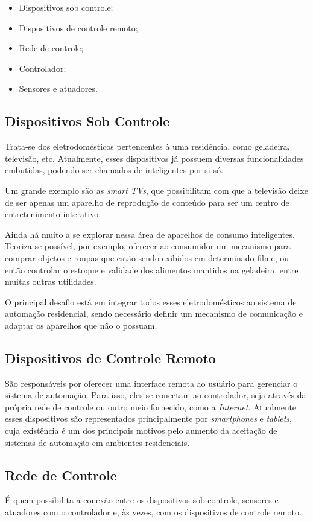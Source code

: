 \begin{itemize}
	\item Dispositivos sob controle;
	\item Dispositivos de controle remoto;
	\item Rede de controle;
	\item Controlador;
	\item Sensores e atuadores.
\end{itemize}

\subsection{Dispositivos Sob Controle}
Trata-se dos eletrodomésticos pertencentes à uma residência, como geladeira, televisão, etc. Atualmente,
esses dispositivos já possuem diversas funcionalidades embutidas, podendo ser chamados de inteligentes por si
só.

Um grande exemplo são as \textit{smart TVs}, que possibilitam com que a televisão deixe de ser apenas um
aparelho de reprodução de conteúdo para ser um centro de entretenimento interativo.

Ainda há muito a se explorar nessa área de aparelhos de consumo inteligentes. Teoriza-se possível, por
exemplo, oferecer ao consumidor um mecanismo para comprar objetos e roupas que estão sendo exibidos em
determinado filme, ou então controlar o estoque e validade dos alimentos mantidos na geladeira, entre muitas
outras utilidades.

O principal desafio está em integrar todos esses eletrodomésticos ao sistema de automação residencial, sendo
necessário definir um mecanismo de comunicação e adaptar os aparelhos que não o possuam.

\subsection{Dispositivos de Controle Remoto}
São responsáveis por oferecer uma interface remota ao usuário para gerenciar o sistema de automação. Para
isso, eles se conectam ao controlador, seja através da própria rede de controle ou outro meio fornecido, como
a \textit{Internet}. Atualmente esses dispositivos são representados principalmente por \textit{smartphones} e
\textit{tablets}, cuja existência é um dos principais motivos pelo aumento da aceitação de sistemas de
automação em ambientes residenciais. \cite{kyas2013}

\subsection{Rede de Controle}
É quem possibilita a conexão entre os dispositivos sob controle, sensores e atuadores com o controlador e, às
vezes, com os dispositivos de controle remoto. \cite{kyas2013}

